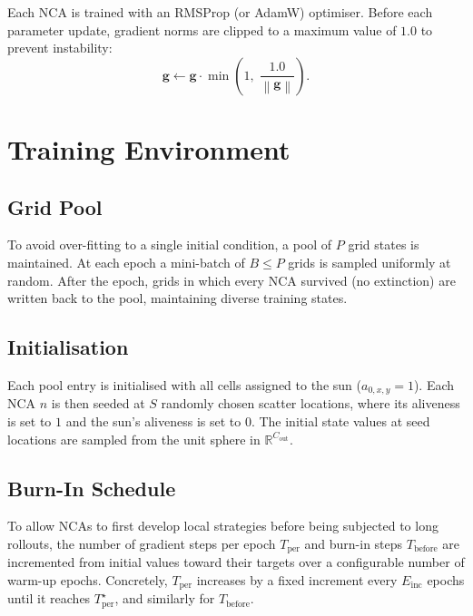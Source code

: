\documentclass[11pt,a4paper]{article}
\newcommand{\R}{\mathbb{R}}
\newcommand{\norm}[1]{\left\lVert#1\right\rVert}
\theoremstyle{definition}
\begin{document}
Each NCA is trained with an RMSProp (or AdamW) optimiser. Before each parameter update, gradient norms are clipped to a maximum value of $1.0$ to prevent instability:
\[
    \mathbf{g} \leftarrow \mathbf{g} \cdot \min\!\left(1,\; \frac{1.0}{\norm{\mathbf{g}}}\right).
\]

\section{Training Environment}

\subsection{Grid Pool}

To avoid over-fitting to a single initial condition, a pool of $P$ grid states is maintained. At each epoch a mini-batch of $B \leq P$ grids is sampled uniformly at random. After the epoch, grids in which every NCA survived (no extinction) are written back to the pool, maintaining diverse training states.

\subsection{Initialisation}

Each pool entry is initialised with all cells assigned to the sun ($a_{0,x,y} = 1$). Each NCA $n$ is then seeded at $S$ randomly chosen scatter locations, where its aliveness is set to $1$ and the sun's aliveness is set to $0$. The initial state values at seed locations are sampled from the unit sphere in $\R^{C_\mathrm{out}}$.

\subsection{Burn-In Schedule}

To allow NCAs to first develop local strategies before being subjected to long rollouts, the number of gradient steps per epoch $T_{\mathrm{per}}$ and burn-in steps $T_{\mathrm{before}}$ are incremented from initial values toward their targets over a configurable number of warm-up epochs. Concretely, $T_{\mathrm{per}}$ increases by a fixed increment every $E_{\mathrm{inc}}$ epochs until it reaches $T_{\mathrm{per}}^{\star}$, and similarly for $T_{\mathrm{before}}$.

\end{document}
